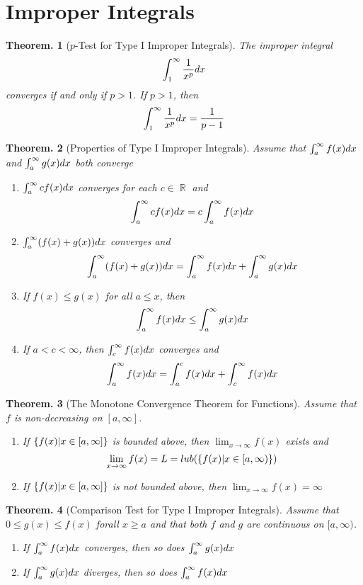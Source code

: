 \documentclass[11pt, a4paper]{memoir}
\DeclareMathOperator{\R}{{\mathbb{R}}}
\theoremstyle{change}
\newtheorem{theorem}{Theorem.}[section]
\theoremstyle{plain}
\theoremstyle{nonumberplain}
\numberwithin{equation}{section}
\begin{document}
\section{Improper Integrals}
\begin{theorem}[$p$-Test for Type I Improper Integrals]
    The improper integral $$\int^\infty_1 \dfrac{1}{x^p} \space dx$$ converges if and only if $p > 1$. If $p > 1$, then $$\int^\infty_1 \dfrac{1}{x^p} \space dx = \dfrac{1}{p-1}$$
\end{theorem}
\begin{theorem}[Properties of Type I Improper Integrals]
    Assume that $\int^\infty_a f(x) \space dx$  and $\int^\infty_a g(x) \space dx$ both converge
    \begin{enumerate}
        \item $\int^\infty_a cf(x) \space dx$ converges for each $c \in \R$ and  $$\int^\infty_a cf(x) \space dx = c \int^\infty_a f(x) \space dx$$
        \item $\int^\infty_a (f(x) + g(x)) \space dx $ converges and $$\int^\infty_a (f(x) + g(x)) \space dx  = \int^\infty_a f(x)\space dx + \int^\infty_a g(x) \space dx$$
        \item If $f(x) \le g(x) $ for all $a \le x$, then $$\int^\infty_a f(x)\space dx \le \int^\infty_a g(x) \space dx$$
        \item If $a < c< \infty $, then $\int^\infty_c f(x) \space dx$ converges and $$\int^\infty_a f(x)\space dx = \int^c_a f(x)\space dx  + \int^\infty_c f(x)\space dx$$
    \end{enumerate}
\end{theorem}
\begin{theorem}[The Monotone Convergence Theorem for Functions]
    Assume that $f$ is non-decreasing on $[a, \infty]$.
    \begin{enumerate}
        \item If $\{f(x) \space | \space  x \in [a, \infty]\}$ is bounded above, then $\lim_{x \to \infty}f(x)$ exists and $$\lim_{x \to \infty} f(x) = L = lub(\{f(x) \space | \space  x \in [a, \infty)\})$$
        \item If $\{f(x) \space | \space  x \in [a, \infty]\}$ is not bounded above, then $\lim_{x \to \infty} f(x) = \infty$
    \end{enumerate}
\end{theorem}
\begin{theorem}[Comparison Test for Type I Improper Integrals]
    Assume that $0\le g(x)\le f(x)$ forall $x\ge a$ and that both $f$ and $g$ are continuous on $[a, \infty)$.
    \begin{enumerate}
        \item If $\int^{\infty}_a f(x) \space dx $ converges, then so does $\int^\infty_a g(x) \space dx$
        \item If $\int^\infty_a g(x) \space dx$ diverges, then so does $\int^{\infty}_a f(x) \space dx$
    \end{enumerate}
\end{theorem}
\end{document}
